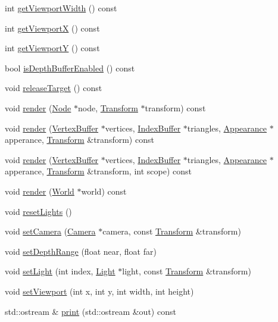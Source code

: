 \begin{CompactItemize}
\item 
int \hyperlink{classm3g_1_1Graphics3D_768e5c057e2fa4c4b17a67134abbf89f}{getViewportWidth} () const 
\item 
int \hyperlink{classm3g_1_1Graphics3D_af58b44cc6219f86c40dadb8a9377856}{getViewportX} () const 
\item 
int \hyperlink{classm3g_1_1Graphics3D_c21665afbf94a8f0153e099833c2b61a}{getViewportY} () const 
\item 
bool \hyperlink{classm3g_1_1Graphics3D_7f17c6781152840d42e756c27b0fb8c8}{isDepthBufferEnabled} () const 
\item 
void \hyperlink{classm3g_1_1Graphics3D_3ffaaf0d0f1e97a07c7f30c9b5a5dd32}{releaseTarget} () const 
\item 
void \hyperlink{classm3g_1_1Graphics3D_9c9ca78b3ce4cc358783a1a2701b9d85}{render} (\hyperlink{classm3g_1_1Node}{Node} $\ast$node, \hyperlink{classm3g_1_1Transform}{Transform} $\ast$transform) const 
\item 
void \hyperlink{classm3g_1_1Graphics3D_dc32291b31d6d3a32037eb9f727f73c0}{render} (\hyperlink{classm3g_1_1VertexBuffer}{VertexBuffer} $\ast$vertices, \hyperlink{classm3g_1_1IndexBuffer}{IndexBuffer} $\ast$triangles, \hyperlink{classm3g_1_1Appearance}{Appearance} $\ast$apperance, \hyperlink{classm3g_1_1Transform}{Transform} \&transform) const 
\item 
void \hyperlink{classm3g_1_1Graphics3D_9179d0d886a57cd3234b34f1b59dfc3c}{render} (\hyperlink{classm3g_1_1VertexBuffer}{VertexBuffer} $\ast$vertices, \hyperlink{classm3g_1_1IndexBuffer}{IndexBuffer} $\ast$triangles, \hyperlink{classm3g_1_1Appearance}{Appearance} $\ast$apperance, \hyperlink{classm3g_1_1Transform}{Transform} \&transform, int scope) const 
\item 
void \hyperlink{classm3g_1_1Graphics3D_8ef004c92d601203b8c697d441e7713f}{render} (\hyperlink{classm3g_1_1World}{World} $\ast$world) const 
\item 
void \hyperlink{classm3g_1_1Graphics3D_b8821ec231e8ebd939ae0feaaf138542}{resetLights} ()
\item 
void \hyperlink{classm3g_1_1Graphics3D_0df7bb61cfeba6626e20fd07ddd1c460}{setCamera} (\hyperlink{classm3g_1_1Camera}{Camera} $\ast$camera, const \hyperlink{classm3g_1_1Transform}{Transform} \&transform)
\item 
void \hyperlink{classm3g_1_1Graphics3D_6fc3837286f3516aa3320aeec9729495}{setDepthRange} (float near, float far)
\item 
void \hyperlink{classm3g_1_1Graphics3D_2bf83cb69f50117dd9d5548fe96d0ab0}{setLight} (int index, \hyperlink{classm3g_1_1Light}{Light} $\ast$light, const \hyperlink{classm3g_1_1Transform}{Transform} \&transform)
\item 
void \hyperlink{classm3g_1_1Graphics3D_0b4ec48e9c19060e9be5648c118c23b1}{setViewport} (int x, int y, int width, int height)
\item 
std::ostream \& \hyperlink{classm3g_1_1Graphics3D_6fea17fa1532df3794f8cb39cb4f911f}{print} (std::ostream \&out) const 
\end{CompactItemize}
